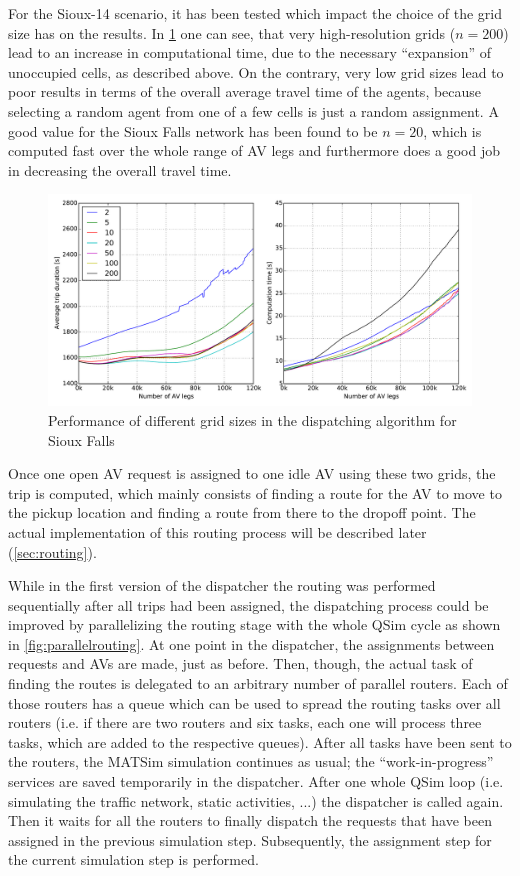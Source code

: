For the Sioux-14 scenario, it has been tested which impact the choice of the grid
size has on the results. In \cref{fig:gridsize} one can see, that very high-resolution
grids ($n=200$) lead to an increase in computational time, due to the necessary
``expansion'' of unoccupied cells, as described above. On the contrary, very low
grid sizes lead to poor results in terms of the overall average travel time of
the agents, because selecting a random agent from one of a few cells is
just a random assignment. A good value for the Sioux Falls network has been found to
be $n=20$, which is computed fast over the whole range of AV legs and furthermore
does a good job in decreasing the overall travel time.

\begin{figure}
    \centering
    \includegraphics[width=1.0\textwidth]{figures/gridsize.pdf}
    \caption{Performance of different grid sizes in the dispatching algorithm for Sioux Falls}
    \label{fig:gridsize}
\end{figure}

Once one open AV request is assigned to one idle AV using these two grids, the
trip is computed, which mainly consists of finding a route for the AV to move
to the pickup location and finding a route from there to the dropoff point. The
actual implementation of this routing process will be described later (\cref{sec:routing}).

While in the first version of the dispatcher the routing was performed sequentially after
all trips had been assigned, the dispatching process could be improved by parallelizing
the routing stage with the whole QSim cycle as shown in \cref{fig:parallelrouting}.
At one point in the dispatcher, the assignments between requests
and AVs are made, just as before. Then, though, the actual task of finding the routes
is delegated to an arbitrary number of parallel routers. Each of those routers has
a queue which can be used to spread the routing tasks over all routers (i.e. if
there are two routers and six tasks, each one will process three tasks, which are
added to the respective queues). After all tasks have been sent to the routers,
the MATSim simulation continues as usual; the ``work-in-progress'' services are
saved temporarily in the dispatcher. After one whole QSim loop (i.e. simulating
the traffic network, static activities, ...) the dispatcher is called again. Then
it waits for all the routers to finally dispatch the requests that have
been assigned in the previous simulation step. Subsequently, the assignment step
for the current simulation step is performed.

